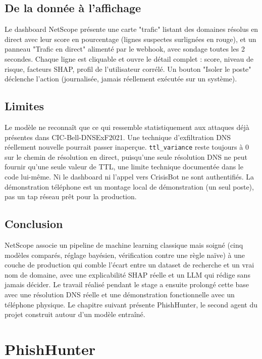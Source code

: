\documentclass[12pt,a4paper]{report}
\begin{document}
\section{De la donnée à l'affichage}

Le dashboard NetScope présente une carte "trafic" listant des domaines résolus en direct avec leur score en pourcentage (lignes suspectes surlignées en rouge), et un panneau "Trafic en direct" alimenté par le webhook, avec sondage toutes les 2 secondes. Chaque ligne est cliquable et ouvre le détail complet : score, niveau de risque, facteurs SHAP, profil de l'utilisateur corrélé. Un bouton "Isoler le poste" déclenche l'action (journalisée, jamais réellement exécutée sur un système).

\section{Limites}

Le modèle ne reconnaît que ce qui ressemble statistiquement aux attaques déjà présentes dans CIC-Bell-DNSExF2021. Une technique d'exfiltration DNS réellement nouvelle pourrait passer inaperçue. \texttt{ttl\_variance} reste toujours à 0 sur le chemin de résolution en direct, puisqu'une seule résolution DNS ne peut fournir qu'une seule valeur de TTL, une limite technique documentée dans le code lui-même. Ni le dashboard ni l'appel vers CrisisBot ne sont authentifiés. La démonstration téléphone est un montage local de démonstration (un seul poste), pas un tap réseau prêt pour la production.

\section{Conclusion}

NetScope associe un pipeline de machine learning classique mais soigné (cinq modèles comparés, réglage bayésien, vérification contre une règle naïve) à une couche de production qui comble l'écart entre un dataset de recherche et un vrai nom de domaine, avec une explicabilité SHAP réelle et un LLM qui rédige sans jamais décider. Le travail réalisé pendant le stage a ensuite prolongé cette base avec une résolution DNS réelle et une démonstration fonctionnelle avec un téléphone physique. Le chapitre suivant présente PhishHunter, le second agent du projet construit autour d'un modèle entraîné.

\chapter{PhishHunter}
\end{document}
